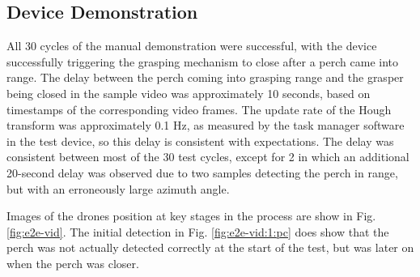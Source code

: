 \subsection{Device Demonstration} \label{sec:results:e2e}

All 30 cycles of the manual demonstration were successful, with the device successfully triggering the grasping mechanism to close 
after a perch came into range. The delay between the perch coming into grasping range and the 
grasper being closed in the sample video was approximately 10 seconds, based on timestamps of the corresponding video frames.
The update rate of the Hough transform was approximately 0.1 Hz, as measured by the task manager software in the test device,
so this delay is consistent with expectations.
The delay was consistent between most of the 30 test cycles, except for 2 in which an additional 20-second delay was observed due to 
two samples detecting the perch in range, but with an erroneously large azimuth angle.

Images of the drones position at key stages in the process are show in 
Fig. \ref{fig:e2e-vid}. The initial detection in Fig. \ref{fig:e2e-vid:1:pc} does show that the perch was not actually 
detected correctly at the start of the test, but was later on when the perch was closer.


